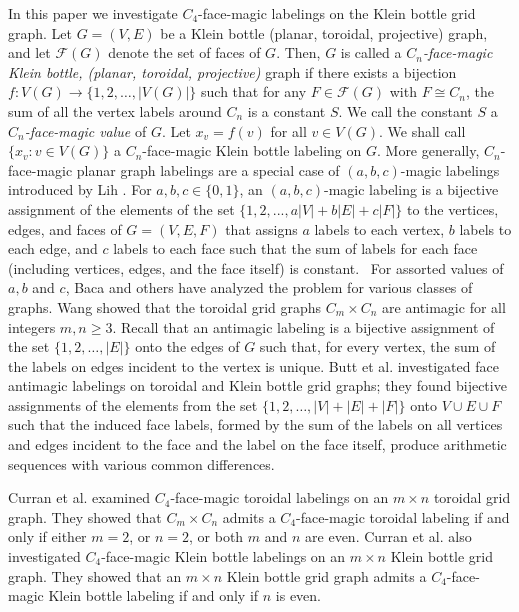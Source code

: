 \documentclass[10pt, reqno]{amsart}
\theoremstyle{definition}
\theoremstyle{plain}
\begin{document}
In this paper we investigate $C_4$-face-magic labelings on the Klein bottle grid graph.
Let $G=(V,E)$ be a Klein bottle (planar, toroidal, projective) graph, and
let $\mathcal{F}(G)$ denote the set of faces of $G$.
Then, $G$ is called a \textit{$C_n$-face-magic 
Klein bottle, (planar, toroidal, projective)} graph if there
exists a bijection $f: V(G) \to \{1, 2, \dots, |V(G)|\}$ such that for any $F \in \mathcal{F}(G)$ with $F \cong C_n$,
the sum of all the vertex labels around $C_n$ is a constant $S$. We call the constant $S$ a \textit{$C_n$-face-magic value} of $G$.
Let $x_v =f(v)$ for all $v\in V(G)$. We shall call $\big\{x_v : v\in V(G)\big\}$ a $C_n$-face-magic Klein bottle labeling on $G$.
More generally, $C_n$-face-magic planar graph labelings are a special case of $(a, b, c)$-magic labelings
introduced by Lih \cite{Lih}.
For $a,b,c\in\{0,1\}$, an $(a, b, c)$-magic labeling is a bijective assignment of the elements of the set $\{1,2,...,a|V|+b|E|+c|F|\}$ to the 
 vertices, edges, and faces of $G=(V,E,F)$ that assigns $a$ labels to each vertex, $b$ labels to each edge, and $c$ labels to each face 
 such that the sum of labels for each face (including vertices, edges, and the face itself) is constant. 
For assorted values of $a, b$ and $c$, Baca and others \cite{Baca1, Baca2, Baca3, Kasif, Kath, Lih} have analyzed
the problem for various classes of graphs.
Wang \cite{Wang} showed that the toroidal grid graphs $C_m \times C_n$ are antimagic for all integers $m,n\geqslant 3$.
Recall that an antimagic labeling is a bijective assignment of the set $\{1,2,\ldots,|E|\}$ onto the edges
of $G$ such that, for every vertex, the sum of the labels on edges incident to the vertex is unique. 
Butt et al. \cite{Buttetal} investigated face antimagic labelings on toroidal and Klein bottle grid graphs;
they found bijective assignments of the elements from the set $\{1,2,\ldots,|V|+|E|+|F|\}$ onto $V\cup E\cup F$ such that the
induced face labels, formed by the sum of the labels on all vertices and edges incident to the face and the label on the face itself,
produce arithmetic sequences with various common differences.

Curran et al. \cite{CurranLowLocke1} examined $C_4$-face-magic toroidal labelings 
on an $m \times n$ toroidal grid graph. 
They showed that $C_m \times C_n$ admits a $C_4$-face-magic toroidal labeling if and only if either $m = 2$, or $n = 2$, or both $m$ and $n$ are even. 
Curran et al. \cite{CurranLowLocke2}  also 
investigated $C_4$-face-magic Klein bottle labelings 
on an $m \times n$ Klein bottle grid graph.
They showed that an $m \times n$ Klein bottle grid graph 
admits a $C_4$-face-magic Klein bottle labeling 
if and only if $n$ is even. 
\end{document}
